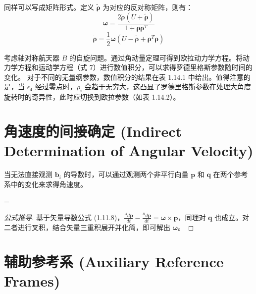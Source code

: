 同样可以写成矩阵形式。定义 \(\widetilde{\boldsymbol{\rho}}\) 为对应的反对称矩阵，则有：
\begin{equation}
\boldsymbol{\omega} = \frac{2\dot{\boldsymbol{\rho}} (U + \widetilde{\boldsymbol{\rho}})}{1 + \boldsymbol{\rho} \boldsymbol{\rho}^T} \tag{6}
\end{equation}
\begin{equation}
\dot{\boldsymbol{\rho}} = \frac{1}{2} \boldsymbol{\omega} (U - \widetilde{\boldsymbol{\rho}} + \boldsymbol{\rho}^T \boldsymbol{\rho}) \tag{7}
\end{equation}

\begin{example}[轴对称航天器的自旋]
考虑轴对称航天器 \(B\) 的自旋问题。通过角动量定理可得到欧拉动力学方程。将动力学方程和运动学方程（式 7）进行数值积分，可以求得罗德里格斯参数随时间的变化。
对于不同的无量纲参数，数值积分的结果在表 1.14.1 中给出。值得注意的是，当 \(\epsilon_4\) 经过零点时，\(\rho_i\) 会趋于无穷大，这凸显了罗德里格斯参数在处理大角度旋转时的奇异性，此时应切换到欧拉参数（如表 1.14.2）。
\end{example}

\section{角速度的间接确定 (Indirect Determination of Angular Velocity)}

当无法直接观测 \(\mathbf{b}_i\) 的导数时，可以通过观测两个非平行向量 \(\mathbf{p}\) 和 \(\mathbf{q}\) 在两个参考系中的变化来求得角速度。
\begin{myformula}[title={间接求解角速度}]
\boldsymbol{\omega} = 
\end{myformula}
\begin{proof}[公式推导]
基于矢量导数公式 (1.11.8)，\(\frac{{}^A d\mathbf{p}}{dt} - \frac{{}^B d\mathbf{p}}{dt} = \boldsymbol{\omega} \times \mathbf{p}\)，同理对 \(\mathbf{q}\) 也成立。对二者进行叉积，结合矢量三重积展开并化简，即可解出 \(\boldsymbol{\omega}\)。
\end{proof}

\section{辅助参考系 (Auxiliary Reference Frames)}

